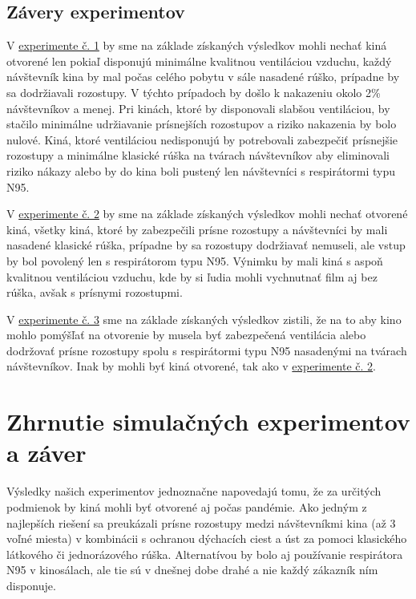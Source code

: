 \documentclass[a4paper, 11pt]{article}
\begin{document}
    \subsection{Závery experimentov}
        V \hyperref[sec:ex.1]{experimente č. 1} by sme na základe získaných výsledkov mohli nechať kiná otvorené len pokiaľ disponujú minimálne kvalitnou ventiláciou vzduchu, každý návštevník kina by mal počas celého pobytu v sále nasadené rúško, prípadne by sa dodržiavali rozostupy. V týchto prípadoch by došlo k nakazeniu okolo 2\% návštevníkov a menej. Pri kinách, ktoré by disponovali slabšou ventiláciou, by stačilo minimálne udržiavanie prísnejších rozostupov a riziko nakazenia by bolo nulové. Kiná, ktoré ventiláciou nedisponujú by potrebovali zabezpečiť prísnejšie rozostupy a minimálne klasické rúška na tvárach návštevníkov aby eliminovali riziko nákazy alebo by do kina boli pustený len návštevníci s respirátormi typu N95.
        \par V \hyperref[sec:ex.2]{experimente č. 2} by sme na základe získaných výsledkov mohli nechať otvorené kiná, všetky kiná, ktoré by zabezpečili prísne rozostupy a návštevníci by mali nasadené klasické rúška, prípadne by sa rozostupy dodržiavať nemuseli, ale vstup by bol povolený len s respirátorom typu N95. Výnimku by mali kiná s aspoň kvalitnou ventiláciou vzduchu, kde by si ľudia mohli vychnutnať film aj bez rúška, avšak s prísnymi rozostupmi.
        \par V \hyperref[sec:ex.2]{experimente č. 3} sme na základe získaných výsledkov zistili, že na to aby kino mohlo pomýšľať na otvorenie by musela byť zabezpečená ventilácia alebo dodržovať prísne rozostupy spolu s respirátormi typu N95 nasadenými na tvárach návštevníkov. Inak by mohli byť kiná otvorené, tak ako v \hyperref[sec:ex.2]{experimente č. 2}.
        
    \section{Zhrnutie simulačných experimentov a záver}
    Výsledky našich experimentov jednoznačne napovedajú tomu, že za určitých podmienok by kiná mohli byť otvorené aj počas pandémie. Ako jedným z najlepších riešení sa preukázali prísne rozostupy medzi návštevníkmi kina (až 3 voľné miesta) v kombinácii s ochranou dýchacích ciest a úst za pomoci klasického látkového či jednorázového rúška. Alternatívou by bolo aj používanie respirátora N95 v kinosálach, ale tie sú v dnešnej dobe drahé a nie každý zákazník ním disponuje.
	\newpage
    
    \renewcommand{\refname}{Bibliografia}
    \label{sec:bib}
    
\end{document}
